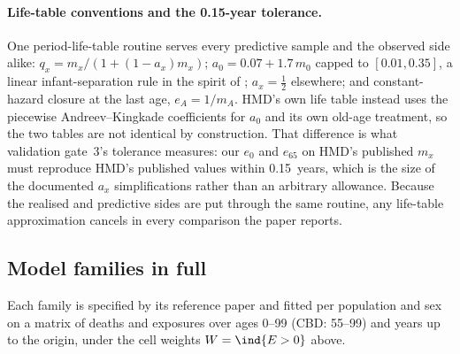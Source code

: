\paragraph{Life-table conventions and the 0.15-year tolerance.}
\label{supp:methods-lifetable}
One period-life-table routine serves every predictive sample and the observed
side alike: $q_x = m_x/(1+(1-a_x)m_x)$; $a_0 = 0.07+1.7\,m_0$ capped to
$[0.01,0.35]$, a linear infant-separation rule in the spirit of
\citet{andreev2015average}; $a_x=\tfrac12$ elsewhere; and constant-hazard
closure at the last age, $e_A = 1/m_A$. HMD's own life table instead uses the
piecewise Andreev--Kingkade coefficients for $a_0$ and its own old-age
treatment, so the two tables are not identical by construction. That
difference is what validation gate~3's tolerance measures: our $e_0$ and
$e_{65}$ on HMD's published $m_x$ must reproduce HMD's published values within
0.15~years, which is the size of the documented $a_x$ simplifications rather
than an arbitrary allowance. Because the realised and predictive sides are put
through the same routine, any life-table approximation cancels in every
comparison the paper reports.

\subsection{Model families in full}
\label{supp:methods-families}

Each family is specified by its reference paper and fitted per population and
sex on a matrix of deaths and exposures over ages 0--99 (CBD: 55--99) and
years up to the origin, under the cell weights $W=\ind\{E>0\}$ above.

